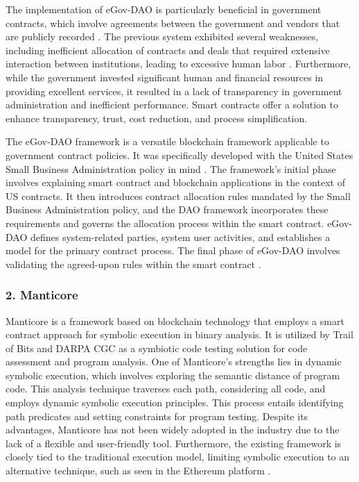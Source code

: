     The implementation of \ac{eGov-DAO} is particularly beneficial in government contracts, which involve agreements between the government and vendors that are publicly recorded \cite{nour2018egovdao}. The previous system exhibited several weaknesses, including inefficient allocation of contracts and deals that required extensive interaction between institutions, leading to excessive human labor \cite{mark2004contracting}. Furthermore, while the government invested significant human and financial resources in providing excellent services, it resulted in a lack of transparency in government administration and inefficient performance. Smart contracts offer a solution to enhance transparency, trust, cost reduction, and process simplification.

    The \ac{eGov-DAO} framework is a versatile blockchain framework applicable to government contract policies. It was specifically developed with the United States Small Business Administration policy in mind \cite{nour2018egovdao}. The framework's initial phase involves explaining smart contract and blockchain applications in the context of US contracts. It then introduces contract allocation rules mandated by the Small Business Administration policy, and the \ac{DAO} framework incorporates these requirements and governs the allocation process within the smart contract. \ac{eGov-DAO} defines system-related parties, system user activities, and establishes a model for the primary contract process. The final phase of \ac{eGov-DAO} involves validating the agreed-upon rules within the smart contract \cite{nour2018egovdao}.

\subsubsection{2. Manticore}

Manticore is a framework based on blockchain technology that employs a smart contract approach for symbolic execution in binary analysis. It is utilized by Trail of Bits and \ac{DARPA} \ac{CGC} as a symbiotic code testing solution for code assessment and program analysis. One of Manticore's strengths lies in dynamic symbolic execution, which involves exploring the semantic distance of program code. This analysis technique traverses each path, considering all code, and employs dynamic symbolic execution principles. This process entails identifying path predicates and setting constraints for program testing. Despite its advantages, Manticore has not been widely adopted in the industry due to the lack of a flexible and user-friendly tool. Furthermore, the existing framework is closely tied to the traditional execution model, limiting symbolic execution to an alternative technique, such as seen in the Ethereum platform \cite{mossberg2019manticore}.

